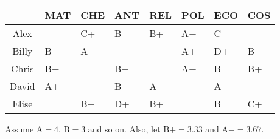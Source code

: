 \documentclass[10pt]{article}
\begin{document}
\begin{problem}[Problem 3]
\begin{enumerate}[label=(\alph*),nolistsep]
            \begin{table}[h]\centering
                \begin{tabular}{c|lllllll}
                    & MAT & CHE & ANT & REL & POL & ECO & COS \\ \hline
                    Alex & & C+ & B & B+ & A\(-\) & C & \\
                    Billy & B\(-\) & A\(-\) & & & A+ & D+ & B \\
                    Chris & B\(-\) & & B+ & &  A\(-\) & B & B+ \\
                    David & A+ & & B\(-\) & A & & A\(-\) & \\
                    Elise & & B\(-\) & D+ & B+ & & B & C+ \\ 
                \end{tabular}
            \end{table}
            Assume \( \text{A} = 4 \), \( \text{B} = 3 \) and so on. Also, let \( \text{B}+ = 3.33 \) and \( \text{A}- = 3.67 \).
    \end{enumerate}
\end{problem}
\end{document}
